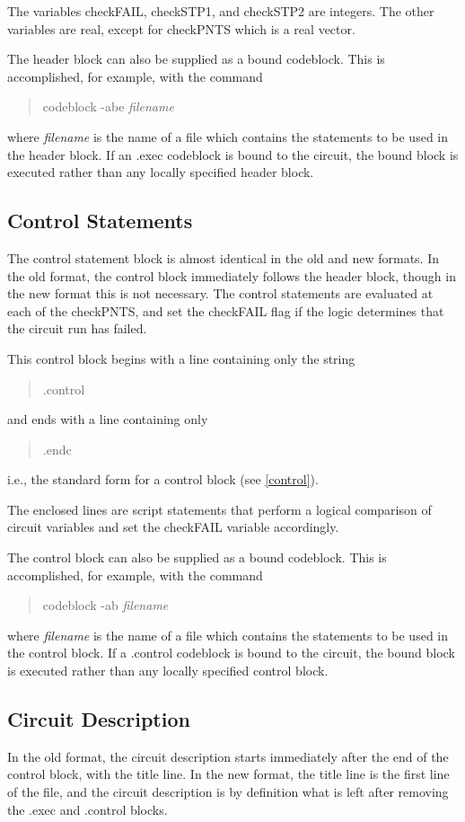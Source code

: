 The variables {\et checkFAIL}, {\et checkSTP1}, and {\et checkSTP2}
are integers.  The other variables are real, except for {\et
checkPNTS} which is a real vector.

The header block can also be supplied as a bound codeblock.
This is accomplished, for example, with the command
\begin{quote}\vt
codeblock -abe {\it filename}
\end{quote}
where {\it filename} is the name of a file which contains the
statements to be used in the header block.  If an {\vt .exec} codeblock
is bound to the circuit, the bound block is executed rather than any
locally specified header block.

\subsection{Control Statements}
The control statement block is almost identical in the old and new
formats.  In the old format, the control block immediately follows the
header block, though in the new format this is not necessary.  The
control statements are evaluated at each of the {\et checkPNTS}, and
set the {\et checkFAIL} flag if the logic determines that the circuit
run has failed.

This control block begins with a line containing only the string
\begin{quote}
{\vt .control}
\end{quote}
and ends with a line containing only
\begin{quote}
{\vt .endc}
\end{quote}
i.e., the standard form for a {\WRspice} control block (see \ref{control}).

The enclosed lines are {\WRspice} script statements that perform a
logical comparison of circuit variables and set the {\et checkFAIL}
variable accordingly.

The control block can also be supplied as a bound codeblock.
This is accomplished, for example, with the command
\begin{quote}\vt
codeblock -ab {\it filename}
\end{quote}
where {\it filename} is the name of a file which contains the statements
to be used in the control block.  If a {\vt .control} codeblock is bound to
the circuit, the bound block is executed rather than any locally
specified control block.

\subsection{Circuit Description}
In the old format, the circuit description starts immediately after the
end of the control block, with the title line.  In the new format, the
title line is the first line of the file, and the circuit description is
by definition what is left after removing the {\vt .exec} and {\vt .control}
blocks.


